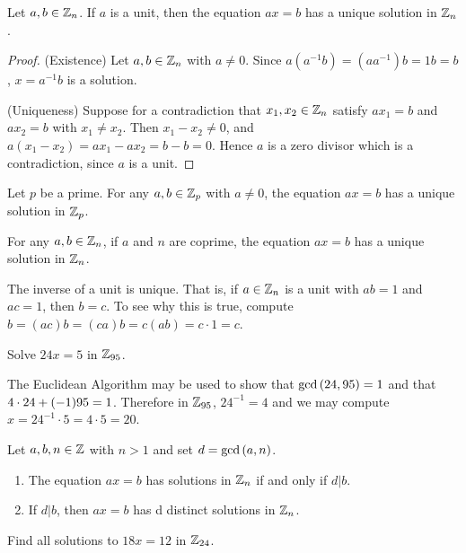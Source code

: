 \documentclass[11pt,fleqn,dvipsnames,usenames]{article}
\begin{document}
\begin{corollary}
Let $a,b\in\mathbb{Z}_{n}$.  If $a$ is a unit, then the equation $ax = b$ has a unique solution in $\mathbb{Z}_{n}$.
\end{corollary}
%
\begin{proof}\phantom{-}

(Existence) Let $a,b\in\mathbb{Z}_{n}$ with $a\neq 0$.  Since $a(a^{-1}b) = (aa^{-1})b = 1b = b$, $x = a^{-1}b$ is a solution.

(Uniqueness) Suppose for a contradiction that $x_{1},x_{2}\in\mathbb{Z}_{n}$ satisfy $ax_{1} = b$ and $ax_{2} = b$ with $x_{1}\neq x_{2}$.  Then $x_{1} - x_{2}\neq 0$, and $a(x_{1} - x_{2}) = ax_{1} - ax_{2} = b - b = 0$.  Hence $a$ is a zero divisor which is a contradiction, since $a$ is a unit.
\end{proof}
%
\begin{corollary}
Let $p$ be a prime.  For any $a,b\in\mathbb{Z}_p$ with $a\neq 0$, the equation $ax = b$ has a unique solution in $\mathbb{Z}_p$.
\end{corollary}
%
\begin{corollary}
For any $a,b\in\mathbb{Z}_{n}$, if $a$ and $n$ are coprime, the equation $ax = b$ has a unique solution in $\mathbb{Z}_{n}$.
\end{corollary}
%
\begin{remark}
The inverse of a unit is unique.  That is, if $a\in\mathbb{Z}_{n}$ is a unit with $ab = 1$ and $ac = 1$, then $b=c$.  To see why this is true, compute $b = (ac)b = (ca)b = c(ab) = c\cdot 1 = c$.
\end{remark}
%
\begin{example}
Solve $24x = 5$ in $\mathbb{Z}_{95}$.
\end{example}
\begin{solution}
The Euclidean Algorithm may be used to show that $\text{gcd}\left(24,95\right) = 1$ and that $4\cdot 24\nolinebreak + \nolinebreak(-1)95 =\nolinebreak 1$.  Therefore in $\mathbb{Z}_{95}$, $24^{-1} = 4$ and we may compute $x = 24^{-1}\cdot 5 = 4\cdot 5 = 20$.
\end{solution}
%
\begin{theorem}\label{numbersolutionsinZn}
Let $a,b,n\in\mathbb{Z}$ with $n > 1$ and set $d = \text{gcd}\left(a,n\right)$.
\begin{enumerate}[(1)]
\item The equation $ax = b$ has solutions in $\mathbb{Z}_{n}$ if and only if $d|b$.
\item If $d|b$, then $ax = b$ has d distinct solutions in $\mathbb{Z}_{n}$.
\end{enumerate}
\end{theorem}
%
\begin{example}
Find all solutions to $18x = 12$ in $\mathbb{Z}_{24}$.
\end{example}
\end{document}
